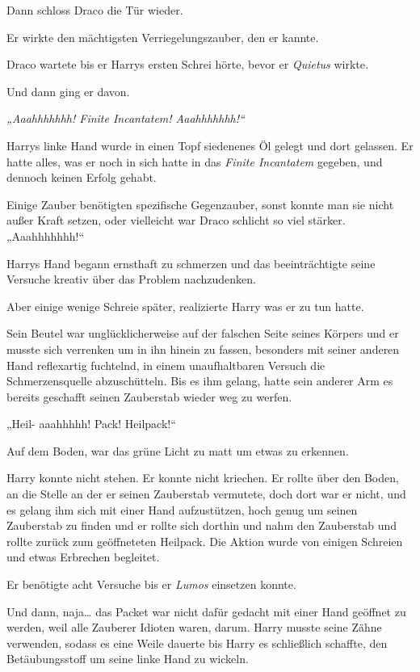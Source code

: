 {Dann schloss Draco die Tür wieder.

Er wirkte den mächtigsten Verriegelungszauber, den er kannte.

Draco wartete bis er Harrys ersten Schrei hörte, bevor er \emph{Quietus} wirkte\emph{.}

Und dann ging er davon.

\emph{„Aaahhhhhhh! Finite Incantatem! Aaahhhhhhh!“}

Harrys linke Hand wurde in einen Topf siedenenes Öl gelegt und dort gelassen. Er hatte alles, was er noch in sich hatte in das \emph{Finite Incantatem} gegeben, und dennoch keinen Erfolg gehabt.

Einige Zauber benötigten spezifische Gegenzauber, sonst konnte man sie nicht außer Kraft setzen, oder vielleicht war Draco schlicht so viel stärker.\\ „Aaahhhhhhh!“

Harrys Hand begann ernsthaft zu schmerzen und das beeinträchtigte seine Versuche kreativ über das Problem nachzudenken.

Aber einige wenige Schreie später, realizierte Harry was er zu tun hatte.

Sein Beutel war unglücklicherweise auf der falschen Seite seines Körpers und er musste sich verrenken um in ihn hinein zu fassen, besonders mit seiner anderen Hand reflexartig fuchtelnd, in einem unaufhaltbaren Versuch die Schmerzensquelle abzuschütteln. Bis es ihm gelang, hatte sein anderer Arm es bereits geschafft seinen Zauberstab wieder weg zu werfen.

„Heil- aaahhhhh! Pack! Heilpack!“

Auf dem Boden, war das grüne Licht zu matt um etwas zu erkennen.

Harry konnte nicht stehen. Er konnte nicht kriechen. Er rollte über den Boden, an die Stelle an der er seinen Zauberstab vermutete, doch dort war er nicht, und es gelang ihm sich mit einer Hand aufzustützen, hoch genug um seinen Zauberstab zu finden und er rollte sich dorthin und nahm den Zauberstab und rollte zurück zum geöffneteten Heilpack. Die Aktion wurde von einigen Schreien und etwas Erbrechen begleitet.

Er benötigte acht Versuche bis er \emph{Lumos} einsetzen konnte.

Und dann, naja… das Packet war nicht dafür gedacht mit einer Hand geöffnet zu werden, weil alle Zauberer Idioten waren, darum. Harry musste seine Zähne verwenden, sodass es eine Weile dauerte bis Harry es schließlich schaffte, den Betäubungsstoff um seine linke Hand zu wickeln.

}
